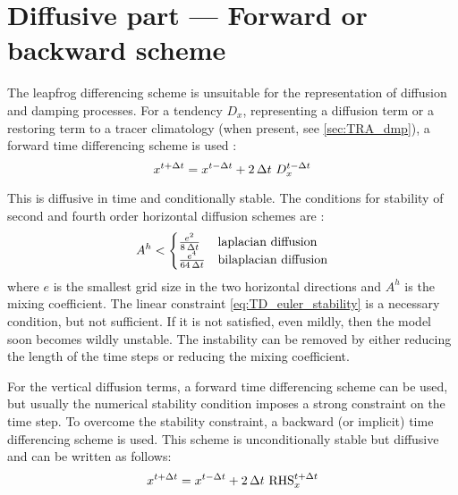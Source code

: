 \documentclass[../main/NEMO_manual]{subfiles}
\begin{document}
\section{Diffusive part --- Forward or backward scheme}
\label{sec:TD_forward_imp}

The leapfrog differencing scheme is unsuitable for
the representation of diffusion and damping processes.
For a tendency $D_x$, representing a diffusion term or a restoring term to a tracer climatology
(when present, see \autoref{sec:TRA_dmp}), a forward time differencing scheme is used :
\[
  x^{t + \Delta t} = x^{t - \Delta t} + 2 \, \Delta t \ D_x^{t - \Delta t}
\]

This is diffusive in time and conditionally stable.
The conditions for stability of second and fourth order horizontal diffusion schemes are
\citep{griffies_bk04}:
\begin{equation}
  \label{eq:TD_euler_stability}
  A^h <
  \begin{cases}
    \frac{e^2}{ 8 \, \Delta t} & \text{laplacian diffusion} \\
    \frac{e^4}{64 \, \Delta t} & \text{bilaplacian diffusion}
  \end{cases}
\end{equation}
where $e$ is the smallest grid size in the two horizontal directions and
$A^h$ is the mixing coefficient.
The linear constraint \autoref{eq:TD_euler_stability} is a necessary condition, but not sufficient.
If it is not satisfied, even mildly, then the model soon becomes wildly unstable.
The instability can be removed by either reducing the length of the time steps or
reducing the mixing coefficient.

For the vertical diffusion terms, a forward time differencing scheme can be used,
but usually the numerical stability condition imposes a strong constraint on the time step.
To overcome the stability constraint, a backward (or implicit) time differencing scheme is used.
This scheme is unconditionally stable but diffusive and can be written as follows:
\begin{equation}
  \label{eq:TD_imp}
  x^{t + \Delta t} = x^{t - \Delta t} + 2 \, \Delta t \ \text{RHS}_x^{t + \Delta t}
\end{equation}

\end{document}
